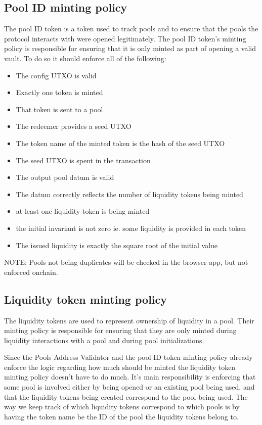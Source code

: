 \documentclass{article}
\begin{document}
\subsection{Pool ID minting policy}

The pool ID token is a token used to track pools
and to ensure that the pools the protocol interacts with were opened legitimately.
The pool ID token's minting policy is responsible for ensuring
that it is only minted as part of opening a valid vault.
To do so it should enforce all of the following:

\begin{itemize}
	\item The config UTXO is valid
	\item Exactly one token is minted
	\item That token is sent to a pool
	\item The redeemer provides a seed UTXO
	\item The token name of the minted token is the hash of the seed UTXO
	\item The seed UTXO is spent in the transaction
	\item The output pool datum is valid
	\item The datum correctly reflects the number of liquidity tokens being minted
	\item at least one liquidity token is being minted
	\item the initial invariant is not zero ie. some liquidity is provided in each token
	\item The issued liquidity is exactly the square root of the initial value
\end{itemize}

NOTE: Pools not being duplicates will be checked in the browser app, but not enforced onchain.

\subsection{Liquidity token minting policy}

The liquidity tokens are used to represent ownership of liquidity in a pool.
Their minting policy is responsible for ensuring that they are only minted
during liquidity interactions with a pool and during pool initializations.

Since the Pools Address Validator and the pool ID token minting policy
already enforce the logic regarding how much should be minted the liquidity
token minting policy doesn't have to do much. It's main responsibility is enforcing that
some pool is involved either by being opened or an existing pool being used, and that
the liquidity tokens being created correspond to the pool being used.
The way we keep track of which liquidity tokens correspond to which pools
is by having the token name be the ID of the pool the liquidity tokens
belong to.
\end{document}
